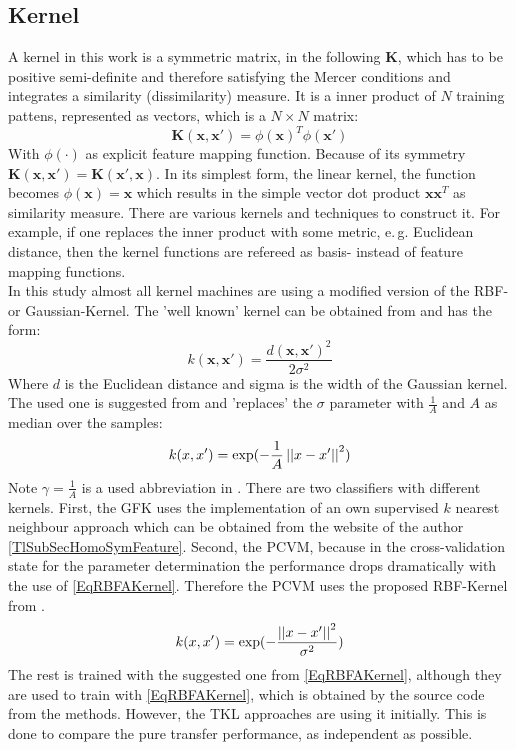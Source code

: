 \subsection{Kernel}\label{EmSubSecKernel}
A kernel in this work is a symmetric matrix, in the following $\mathbf{K}$, which has to be positive semi-definite and therefore satisfying the Mercer conditions and integrates a similarity (dissimilarity) measure.
It is a inner product of $N$ training pattens, represented as vectors, which is a $N \times N$ matrix:
\begin{equation}
	\mathbf{K}(\mathbf{x},\mathbf{x'}) = \phi(\mathbf{x})^T\phi(\mathbf{x'})
\end{equation}
With $\phi(\cdot)$ as explicit feature mapping function.
Because of its symmetry $\mathbf{K}(\mathbf{x},\mathbf{x'})=\mathbf{K}(\mathbf{x'},\mathbf{x})$.
In its simplest form, the linear kernel, the function becomes $\phi(\mathbf{x}) = \mathbf{x}$ which results in the simple vector dot product $\mathbf{x}\mathbf{x}^T$ as similarity measure. There are various kernels and techniques to construct it. For example, if one replaces the inner product with some metric, e.\,g. Euclidean distance, then the kernel functions are refereed as basis- instead of feature mapping functions.\cite[p. 291-296, 329]{Bishop.2009}\\
In this study almost all kernel machines are using a modified version of the \ac{RBF}- or Gaussian-Kernel.
The 'well known' kernel can be obtained from \cite[p. 17]{Vert.2004} and has the form:
\begin{equation}\label{EqRBFOriginalKernel}
	k(\mathbf{x},\mathbf{x}') = \frac{d(\mathbf{x},\mathbf{x}')^2}{2\sigma^2}
\end{equation}
Where $d$ is the Euclidean distance and sigma is the width of the Gaussian kernel.\\
The used one is suggested from \cite{Duan.2012} and 'replaces' the $\sigma$ parameter with $\frac{1}{A}$ and $A$ as median over the samples: 
\begin{equation}\label{EqRBFAKernel}
	k(x,x') = \exp(-\frac{1}{A}\left\vert\left\vert x-x'\right\vert\right\vert^2)
\end{equation} 
Note $\gamma = \frac{1}{A}$ is a used abbreviation in \cite{Long.2015}.
There are two classifiers with different kernels.
First, the \acs{GFK} uses the implementation of an own supervised $k$ nearest neighbour approach which can be obtained from the website of the author \ref{TlSubSecHomoSymFeature}.
Second, the \acs{PCVM}, because in the cross-validation state for the parameter determination the performance drops dramatically with the use of \eqref{EqRBFAKernel}.
Therefore the \acs{PCVM} uses the proposed \acs{RBF}-Kernel from \cite{Chen.2009}. 
\begin{equation}\label{RBFKernelPCVM}
k(x,x') = \exp(-\frac{\left\vert\left\vert x-x'\right\vert\right\vert^2}{\sigma^2})
\end{equation}
The rest is trained with the suggested one from \eqref{EqRBFAKernel}, although they are used to train with \eqref{EqRBFAKernel}, which is obtained by the source code from the methods.
However, the \acs{TKL} approaches are using it initially.
This is done to compare the pure transfer performance, as independent as possible.

